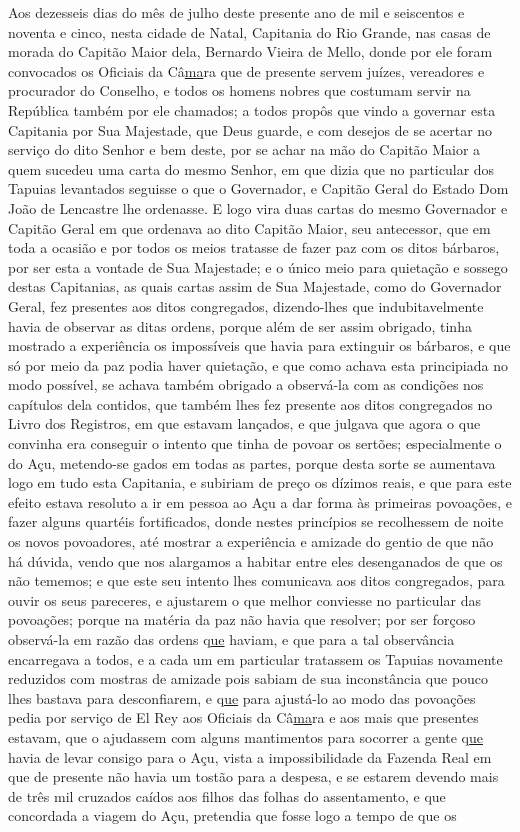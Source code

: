 \begin{refsection}
    Aos dezesseis dias do mês de julho deste presente ano de mil e seiscentos e noventa e cinco, nesta cidade de Natal, Capitania do Rio Grande, nas casas de morada do Capitão Maior dela, Bernardo Vieira de Mello, donde por ele foram convocados os Oficiais da Câ\underline{ma}ra que de presente servem juízes, vereadores e procurador do Conselho, e todos os homens nobres que costumam servir na República também por ele chamados; a todos propôs que vindo a governar esta Capitania por Sua Majestade, que Deus guarde, e com desejos de se acertar no serviço do dito Senhor e bem deste, por se achar na mão do Capitão Maior a quem sucedeu uma carta do mesmo Senhor, em que dizia que no particular dos Tapuias levantados seguisse o que o Governador, e Capitão Geral do Estado Dom João de Lencastre lhe ordenasse. E logo vira duas cartas do mesmo Governador e Capitão Geral em que ordenava ao dito Capitão Maior, seu antecessor, que em toda a ocasião e por todos os meios tratasse de fazer paz com os ditos bárbaros, por ser esta a vontade de Sua Majestade; e o único meio para quietação e sossego destas Capitanias, as quais cartas assim de Sua Majestade, como do Governador Geral, fez presentes aos ditos congregados, dizendo-lhes que indubitavelmente havia de observar as ditas ordens, porque além de ser assim obrigado, tinha mostrado a experiência os impossíveis que havia para extinguir os bárbaros, e que só por meio da paz podia haver quietação, e que como achava esta principiada no modo possível, se achava também obrigado a observá-la com as condições nos capítulos dela contidos, que também lhes fez presente aos ditos congregados no Livro dos Registros, em que estavam lançados, e que julgava que agora o que convinha era conseguir o intento que tinha de povoar os sertões; especialmente o do Açu, metendo-se gados em todas as partes, porque desta sorte se aumentava logo em tudo esta Capitania, e subiriam de preço os dízimos reais, e que para este efeito estava resoluto a ir em pessoa ao Açu a dar forma às primeiras povoações, e fazer alguns quartéis fortificados, donde nestes princípios se recolhessem de noite os novos povoadores, até mostrar a experiência e amizade do gentio de que não há dúvida, vendo que nos alargamos a habitar entre eles desenganados de que os não tememos; e que este seu intento lhes comunicava aos ditos congregados, para ouvir os seus pareceres, e ajustarem o que melhor conviesse no particular das povoações; porque na matéria da paz não havia que resolver; por ser forçoso observá-la em razão das ordens q\underline{ue} haviam, e que para a tal observância encarregava a todos, e a cada um em particular tratassem os Tapuias novamente reduzidos com mostras de amizade pois sabiam de sua inconstância que pouco lhes bastava para desconfiarem, e q\underline{ue} para ajustá-lo ao modo das povoações pedia por serviço de El Rey aos Oficiais da Câ\underline{ma}ra e aos mais que presentes estavam, que o ajudassem com alguns mantimentos para socorrer a gente q\underline{ue} havia de levar consigo para o Açu, vista a impossibilidade da Fazenda Real em que de presente não havia um tostão para a despesa, e se estarem devendo mais de três mil cruzados caídos aos filhos das folhas do assentamento, e que concordada a viagem do Açu, pretendia que fosse logo a tempo de que os 
\end{refsection}

